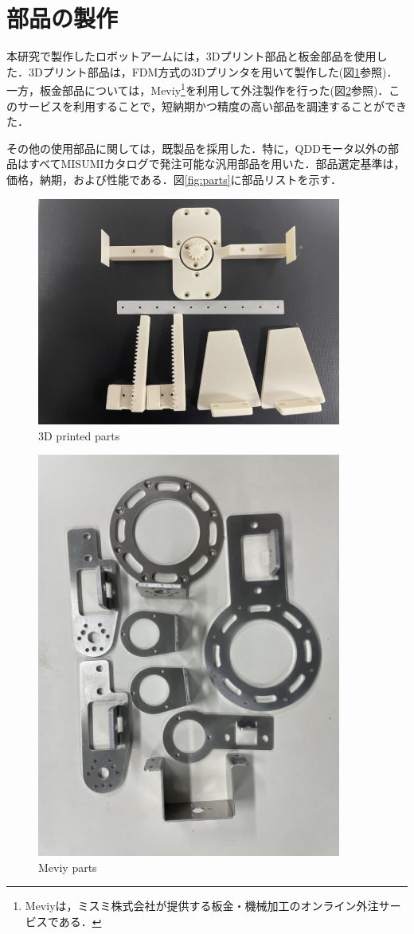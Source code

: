 \section{部品の製作}
本研究で製作したロボットアームには，3Dプリント部品と板金部品を使用した．3Dプリント部品は，FDM方式の3Dプリンタを用いて製作した(図\ref{fig:3Dprint}参照)．一方，板金部品については，Meviy\footnote{Meviyは，ミスミ株式会社が提供する板金・機械加工のオンライン外注サービスである．}を利用して外注製作を行った(図\ref{fig:meviy}参照)．このサービスを利用することで，短納期かつ精度の高い部品を調達することができた．

その他の使用部品に関しては，既製品を採用した．特に，QDDモータ以外の部品はすべてMISUMIカタログで発注可能な汎用部品を用いた．部品選定基準は，価格，納期，および性能である．図\ref{fig:parts}に部品リストを示す．
\begin{figure}
  \centering
  \includegraphics[width=10cm]{images/product/3Dprint.jpg}
  \caption{3D printed parts}
  \label{fig:3Dprint}
\end{figure}
\begin{figure}
  \centering
  \includegraphics[width=10cm]{images/product/meviy.jpg}
  \caption{Meviy parts}
  \label{fig:meviy}
\end{figure}

